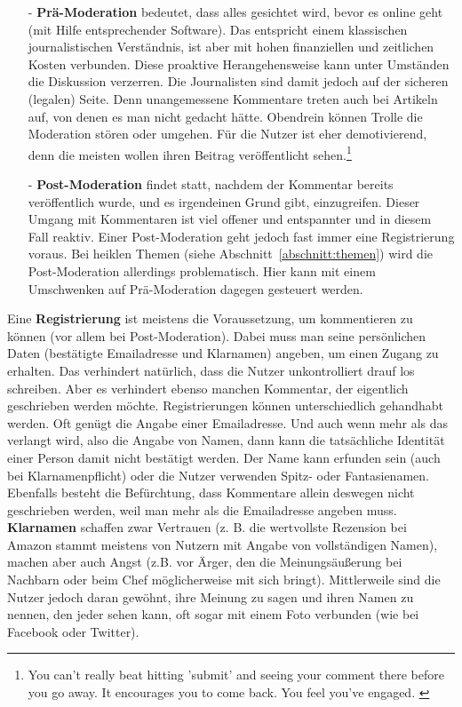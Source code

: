 \begin{itemize}
  \item[-] {\bfseries Prä-Moderation}
    bedeutet, dass alles gesichtet wird, bevor es online geht (mit Hilfe
    entsprechender Software). Das entspricht einem klassischen journalistischen
    Verständnis, ist aber mit hohen finanziellen und zeitlichen Kosten
    verbunden.  Diese \glqq proaktive\grqq{} Herangehensweise
    \autocite[S.~108]{reich} kann unter Umständen die Diskussion verzerren. Die
    Journalisten sind damit jedoch auf der sicheren (legalen) Seite. Denn
    unangemessene Kommentare treten auch bei Artikeln auf, von denen es man
    nicht gedacht hätte. Obendrein können \glqq Trolle\grqq{} die Moderation
    stören oder umgehen. Für die Nutzer ist eher demotivierend, denn die meisten
    wollen ihren Beitrag veröffentlicht sehen.\footnote{\glqq You can't really beat
    hitting 'submit' and seeing your comment there before you go away. It
    encourages you to come back. You feel you've engaged.\grqq\-
    \autocite[S.~109]{reich}}

  \item[-] {\bfseries Post-Moderation}
    findet statt, nachdem der Kommentar bereits veröffentlich wurde, und es
    irgendeinen Grund gibt, einzugreifen. Dieser Umgang mit Kommentaren ist viel
    offener und entspannter und in diesem Fall \glqq reaktiv\grqq. Einer
    Post-Moderation geht jedoch fast immer eine Registrierung voraus. Bei
    heiklen Themen (siehe Abschnitt~\ref{abschnitt:themen})
    wird die Post-Moderation allerdings problematisch. Hier kann mit einem
    Umschwenken auf Prä-Moderation dagegen gesteuert werden.
\end{itemize}

Eine {\bfseries Registrierung} ist meistens die Voraussetzung, um kommentieren
zu können (vor allem bei Post-Moderation). Dabei muss man seine persönlichen
Daten (be\-stä\-tig\-te Emailadresse und Klarnamen) angeben, um einen Zugang zu
erhalten. Das verhindert natürlich, dass die Nutzer unkontrolliert drauf los
schreiben. Aber es verhindert ebenso manchen Kommentar, der eigentlich
geschrieben werden möchte. Registrierungen können unterschiedlich gehandhabt
werden. Oft genügt die Angabe einer Emailadresse. Und auch wenn mehr als das
verlangt wird, also die Angabe von Namen, dann kann die tatsächliche Identität
einer Person damit nicht bestätigt werden. Der Name kann erfunden sein (auch bei
Klarnamenpflicht) oder die Nutzer verwenden Spitz- oder Fantasienamen. Ebenfalls
besteht die Befürchtung, dass Kommentare allein deswegen nicht geschrieben
werden, weil man mehr als die Emailadresse angeben muss.  {\bfseries Klarnamen}
schaffen zwar Vertrauen (z. B. die wertvollste Rezension bei Amazon stammt
meistens von Nutzern mit Angabe von vollständigen Namen), machen aber auch Angst
(z.B. vor Ärger, den die Meinungsäußerung bei Nachbarn oder beim Chef
möglicherweise mit sich bringt). Mittlerweile sind die Nutzer jedoch daran
gewöhnt, ihre Meinung zu sagen und ihren Namen zu nennen, den jeder sehen kann,
oft sogar mit einem Foto verbunden (wie bei Facebook oder Twitter).


